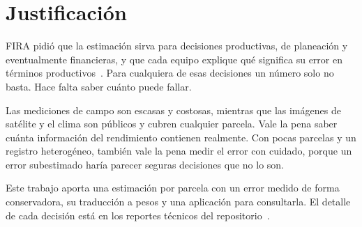 \section{Justificación}\label{sec:justificacion}

FIRA pidió que la estimación sirva para decisiones productivas, de planeación y eventualmente financieras, y que cada
equipo explique qué significa su error en términos productivos~\cite{preguntas}. Para cualquiera de esas decisiones un
número solo no basta. Hace falta saber cuánto puede fallar.

Las mediciones de campo son escasas y costosas, mientras que las imágenes de satélite y el clima son públicos y cubren
cualquier parcela. Vale la pena saber cuánta información del rendimiento contienen realmente. Con pocas parcelas y un
registro heterogéneo, también vale la pena medir el error con cuidado, porque un error subestimado haría parecer
seguras decisiones que no lo son.

Este trabajo aporta una estimación por parcela con un error medido de forma conservadora, su traducción a pesos y una
aplicación para consultarla. El detalle de cada decisión está en los reportes técnicos del repositorio~\cite{repo}.

